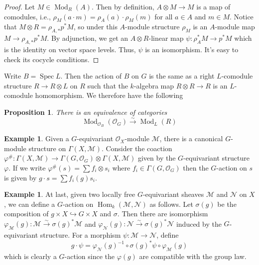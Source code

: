 \documentclass[11pt, a4paper]{article}
\newtheorem{proposition}[theorem]{Proposition}
\theoremstyle{definition}
\newtheorem{example}[theorem]{Example}
\newcommand{\s}[0]{\sigma}
\newcommand{\Spec}[0]{\operatorname{Spec}}
\newcommand{\Hom}[0]{\operatorname{Hom}}
\newcommand{\Mod}{\operatorname{Mod}}
\begin{document}
    \begin{proof}
        Let $M\in\Mod_R(A)$. Then by definition, $A\otimes M\to M$ is a map of comodules, i.e., $\rho_M(a\cdot m)=\rho_A(a)\cdot\rho_M(m)$ for all $a\in A$ and $m\in M$. Notice that $M\otimes R=\rho_{A,*}p^*M$, so under this $A$-module structure $\rho_M$ is an $A$-module map $M\to \rho_{A,*}p^*M$. By adjunction, we get an $A\otimes R$-linear map $\psi:\rho_A^*M\to p^*M$ which is the identity on vector space levels. Thus, $\psi$ is an isomorphism. It's easy to check its cocycle conditions.
    \end{proof}
    Write $B=\Spec L$. Then the action of $B$ on $G$ is the same as a right $L$-comodule structure $R\to R\otimes L$ on $R$ such that the $k$-algebra map $R\otimes R\to R$ is an $L$-comodule homomorphism. We therefore have the following
    \begin{proposition}\label{prop-b-equiv-module-comodule}
        There is an equivalence of categories
        \[\Mod_{\mathcal O_B}(\mathcal O_G)\xrightarrow{\sim}\Mod_L(R)\]
    \end{proposition}
    \begin{example}
        Given a $G$-equivariant $\mathcal O_X$-module $\mathcal M$, there is a canonical $G$-module structure on $\Gamma(X, \mathcal M)$. Consider the coaction $\varphi^\#:\Gamma(X, \mathcal M)\to\Gamma(G, \mathcal O_G)\otimes \Gamma(X, \mathcal M)$ given by the $G$-equivariant structure $\varphi$. If we write $\varphi^\#(s)=\sum f_i\otimes s_i$ where $f_i\in\Gamma(G, \mathcal O_G)$ then the $G$-action on $s$ is given by $g\cdot s=\sum f_i(g)s_i$.
    \end{example}
    \begin{example}\label{exp-act-on-hom}
        At last, given two locally free $G$-equivariant sheaves $\mathcal M$ and $\mathcal N$ on $X$, we can define a $G$-action on $\Hom_k(\mathcal M,\mathcal N)$ as follows. Let $\s(g)$ be the composition of $g\times X\hookrightarrow G\times X$ and $\s$. Then there are isomorphism $\varphi_{\mathcal M}(g):\mathcal M\xrightarrow{\sim}\s(g)^*\mathcal M$ and $\varphi_{\mathcal N}(g):\mathcal N\xrightarrow{\sim}\s(g)^*\mathcal N$ induced by the $G$-equivariant structure. For a morphism $\psi:\mathcal M\to\mathcal N$, define 
        \[g\cdot\psi=\varphi_{\mathcal N}(g)^{-1}\circ\s(g)^*\psi\circ\varphi_{\mathcal M}(g)\]
        which is clearly a $G$-action since the $\varphi(g)$ are compatible with the group law.
    \end{example}
    
\end{document}
